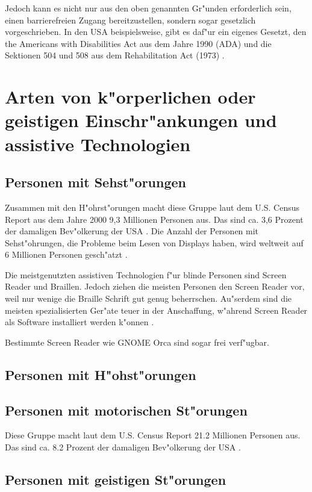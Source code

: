 \documentclass[a4paper,bibtotoc,oneside]{scrbook}
\begin{document}
Jedoch kann es nicht nur aus den oben genannten Gr"unden erforderlich sein,
einen barrierefreien Zugang bereitzustellen, sondern sogar gesetzlich
vorgeschrieben. In den USA beispielsweise, gibt es daf"ur ein eigenes
Gesetzt, den the Americans with Disabilities Act aus dem Jahre 1990 (ADA) und
die Sektionen 504 und 508 aus dem Rehabilitation
Act (1973) \cite{achieving_web_acc}.

\section[Erster Abschnitt]{Arten von k"orperlichen oder geistigen
Einschr"ankungen und assistive Technologien}

\subsection{Personen mit Sehst"orungen}
Zusammen mit den H"ohrst"orungen macht diese Gruppe laut dem U.S. Census Report
aus dem Jahre 2000 9,3 Millionen Personen aus. Das sind ca. 3,6 Prozent der
damaligen Bev"olkerung der USA \cite{us_cens}. 
Die Anzahl der Personen mit Sehst"ohrungen, die Probleme beim Lesen von Displays
haben, wird weltweit auf 6 Millionen Personen
gesch"atzt \cite{screen_read_frust}.

Die meistgenutzten assistiven Technologien f"ur blinde Personen sind Screen
Reader und Braillen. Jedoch ziehen die meisten Personen den Screen Reader vor,
weil nur wenige die Braille Schrift gut genug beherrschen. Au"serdem sind die
meisten spezialisierten Ger"ate teuer in der Anschaffung, w"ahrend Screen Reader
als Software installiert werden k"onnen \cite{screen_read_frust}. 

Bestimmte Screen Reader wie GNOME Orca \cite{orca} sind sogar frei verf"ugbar.


\subsection{Personen mit H"ohst"orungen}

\subsection{Personen mit motorischen St"orungen}
Diese Gruppe macht laut dem U.S. Census Report 21.2 Millionen Personen aus. Das
sind ca. 8.2 Prozent der damaligen Bev"olkerung der USA \cite{us_cens}.

\subsection{Personen mit geistigen St"orungen}
\end{document}
